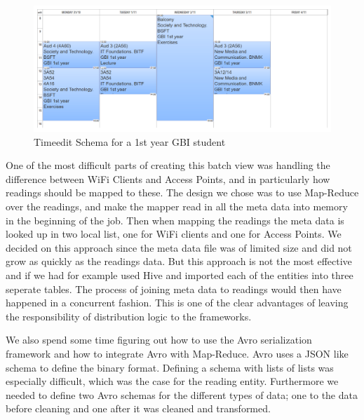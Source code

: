 	\begin{figure}[H]
		\centering
		\includegraphics[width=\linewidth]{figures/schema-from-timeedit.png}
		\caption{Timeedit Schema for a 1st year GBI student}
		\label{fig:timeedit_schema}
	\end{figure}
	
	\newpar One of the most difficult parts of creating this batch view was handling the difference between WiFi Clients and Access Points, and in particularly how readings should be mapped to these. The design we chose was to use Map-Reduce over the readings, and make the mapper read in all the meta data into memory in the beginning of the job. Then when mapping the readings the meta data is looked up in two local list, one for WiFi clients and one for Access Points. We decided on this approach since the meta data file was of limited size and did not grow as quickly as the readings data. But this approach is not the most effective and if we had for example used Hive and imported each of the entities into three seperate tables. The process of joining meta data to readings would then have happened in a concurrent fashion. This is one of the clear advantages of leaving the responsibility of distribution logic to the frameworks.
	
	\newpar We also spend some time figuring out how to use the Avro serialization framework and how to integrate Avro with Map-Reduce. Avro uses a JSON like schema to define the binary format. Defining a schema with lists of lists was especially difficult, which was the case for the reading entity. Furthermore we needed to define two Avro schemas for the different types of data; one to the data before cleaning and one after it was cleaned and transformed.